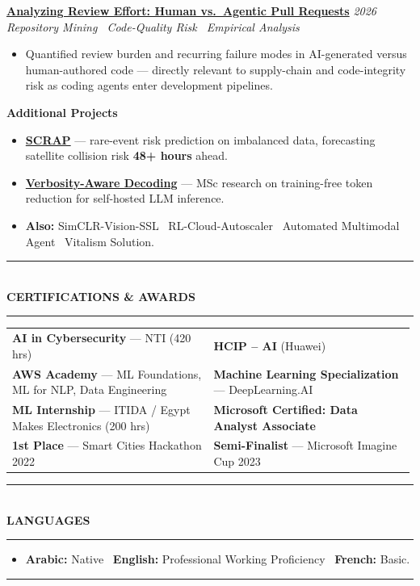 \documentclass[10pt, a4paper]{article}
\makeatletter
\newcommand{\cvsection}[1]{%
  \vspace{3pt}%
  {\color{navy}\rule{\linewidth}{1.1pt}}\\[0.5pt]%
  {\color{navy}\bfseries\fontsize{9.5}{11}\selectfont\uppercase{#1}}\\[-4pt]%
  {\color{teal}\rule{\linewidth}{0.6pt}}%
  \vspace{2pt}%
}
\newcommand{\cvproject}[3]{%
  \vspace{2.5pt}%
  {\bfseries\color{navy}#1} \hfill {\color{midgray}\textit{#3}}\\[-1.5pt]%
  {\color{teal}\textit{#2}}%
}
\newcommand{\cvmini}[2]{\item {\bfseries\color{navy}#1} --- #2}
\newenvironment{cvitems}{%
  \begin{itemize}[leftmargin=11pt, itemsep=0.5pt, parsep=0pt, topsep=1pt,
                  label={\textcolor{teal}{$\bullet$}}]
}{%
  \end{itemize}%
}
\newenvironment{dualcol}{%
  \begin{tabular*}{\linewidth}{@{}p{0.495\linewidth}@{\hspace{0.01\linewidth}}p{0.495\linewidth}@{}}
}{%
  \end{tabular*}%
}
\makeatother
\begin{document}
\cvproject{\href{https://github.com/MahmoudAlyosify/Analyzing-Review-Effort-in-Human-vs.-Agentic-Pull-Requests}{Analyzing Review Effort: Human vs.\ Agentic Pull Requests}}
          {Repository Mining \textperiodcentered\ Code-Quality Risk \textperiodcentered\ Empirical Analysis}
          {2026}
\begin{cvitems}
  \item Quantified review burden and recurring failure modes in AI-generated versus human-authored code --- directly relevant to supply-chain and code-integrity risk as coding agents enter development pipelines.
\end{cvitems}

\vspace{3pt}
{\bfseries\color{navy}Additional Projects}
\begin{cvitems}
  \cvmini{\href{https://github.com/MahmoudAlyosify/SCRAP-Satellite-Collision-Risk-Assessment-and-Prediction}{SCRAP}}{rare-event risk prediction on imbalanced data, forecasting satellite collision risk \textbf{48+ hours} ahead.}
  \cvmini{\href{https://github.com/MahmoudAlyosify/minimal-lm}{Verbosity-Aware Decoding}}{MSc research on training-free token reduction for self-hosted LLM inference.}
  \item \textbf{Also:} SimCLR-Vision-SSL \textperiodcentered\ RL-Cloud-Autoscaler \textperiodcentered\ Automated Multimodal Agent \textperiodcentered\ Vitalism Solution.
\end{cvitems}

\cvsection{Certifications \& Awards}

\begin{dualcol}
  \textbf{AI in Cybersecurity} --- NTI (420 hrs) &
  \textbf{HCIP -- AI} (Huawei) \\[2pt]
  \textbf{AWS Academy} --- ML Foundations, ML for NLP, Data Engineering &
  \textbf{Machine Learning Specialization} --- DeepLearning.AI \\[2pt]
  \textbf{ML Internship} --- ITIDA / Egypt Makes Electronics (200 hrs) &
  \textbf{Microsoft Certified: Data Analyst Associate} \\[2pt]
  \textbf{1st Place} --- Smart Cities Hackathon 2022 &
  \textbf{Semi-Finalist} --- Microsoft Imagine Cup 2023 \\
\end{dualcol}

\cvsection{Languages}

\begin{cvitems}
  \item \textbf{Arabic:} Native \textperiodcentered\ \textbf{English:} Professional Working Proficiency \textperiodcentered\ \textbf{French:} Basic.
\end{cvitems}

\vspace{3pt}
{\color{navy}\rule{\linewidth}{0.8pt}}
\end{document}

